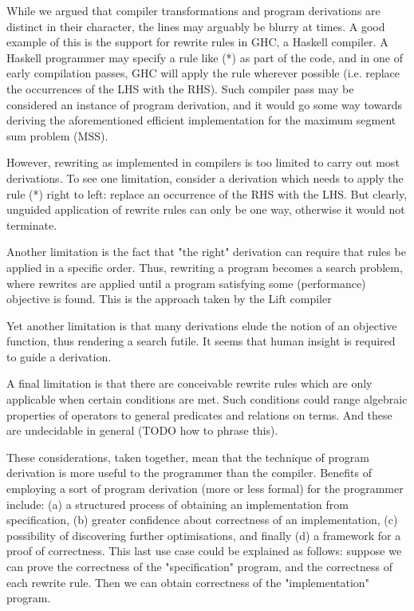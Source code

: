\documentclass[bsc,frontabs,twoside,singlespacing,parskip,deptreport]{infthesis}
\theoremstyle{definition}
\begin{document}
While we argued that compiler transformations and program derivations
are distinct in their character, the lines may arguably be blurry at
times. A good example of this is the support for rewrite rules in GHC,
a Haskell compiler. A Haskell programmer may specify a rule like (*)
as part of the code, and in one of early compilation passes, GHC will
apply the rule wherever possible (i.e. replace the occurrences of the
LHS with the RHS). Such compiler pass may be considered an instance of
program derivation, and it would go some way towards deriving the
aforementioned efficient implementation for the maximum segment sum
problem (MSS).

However, rewriting as implemented in compilers is too limited to carry
out most derivations. To see one limitation, consider a derivation
which needs to apply the rule (*) right to left: replace an occurrence
of the RHS with the LHS. But clearly, unguided application of rewrite
rules can only be one way, otherwise it would not terminate.

Another limitation is the fact that "the right" derivation can require
that rules be applied in a specific order. Thus, rewriting a program
becomes a search problem, where rewrites are applied until a program
satisfying some (performance) objective is found. This is the approach
taken by the Lift compiler \cite{TODO}

Yet another limitation is that many derivations elude the notion of an
objective function, thus rendering a search futile. It seems that
human insight is required to guide a derivation.

A final limitation is that there are conceivable rewrite rules which
are only applicable when certain conditions are met. Such conditions
could range algebraic properties of operators to general predicates
and relations on terms. And these are undecidable in general (TODO how
to phrase this).

These considerations, taken together, mean that the technique of
program derivation is more useful to the programmer than the
compiler. Benefits of employing a sort of program derivation (more or
less formal) for the programmer include: (a) a structured process of
obtaining an implementation from specification, (b) greater confidence
about correctness of an implementation, (c) possibility of discovering
further optimisations, and finally (d) a framework for a proof of
correctness. This last use case could be explained as follows: suppose
we can prove the correctness of the "specification" program, and the
correctness of each rewrite rule. Then we can obtain correctness of
the "implementation" program.
\end{document}
